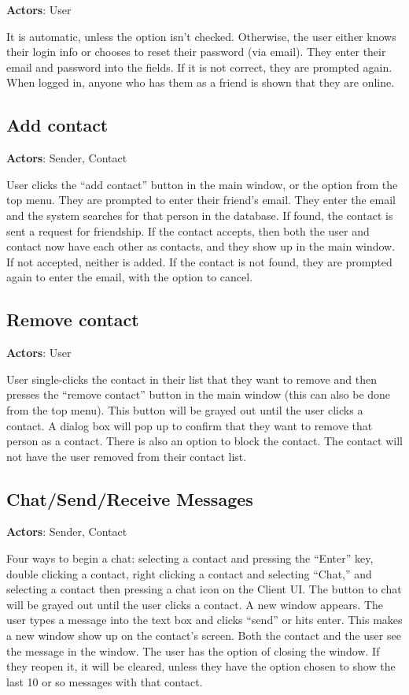 {\bf Actors}: User

It is automatic, unless the option isn't checked. Otherwise, the user either knows their login info or chooses to reset their password (via email). They enter their email and password into the fields. If it is not correct, they are prompted again. When logged in, anyone who has them as a friend is shown that they are online.

\subsection{Add contact}

{\bf Actors}: Sender, Contact

User clicks the ``add contact'' button in the main window, or the option from the top menu. They are prompted to enter their friend's email. They enter the email and the system searches for that person in the database. If found, the contact is sent a request for friendship. If the contact accepts, then both the user and contact now have each other as contacts, and they show up in the main window. If not accepted, neither is added. If the contact is not found, they are prompted again to enter the email, with the option to cancel.

\subsection{Remove contact}

{\bf Actors}: User

User single-clicks the contact in their list that they want to remove and then presses the ``remove contact'' button in the main window (this can also be done from the top menu). This button will be grayed out until the user clicks a contact. A dialog box will pop up to confirm that they want to remove that person as a contact. There is also an option to block the contact. The contact will not have the user removed from their contact list.

\subsection{Chat/Send/Receive Messages}

{\bf Actors}: Sender, Contact

Four ways to begin a chat: selecting a contact and pressing the ``Enter'' key, double clicking a contact, right clicking a contact and selecting ``Chat,'' and selecting a contact then pressing a chat icon on the Client UI. The button to chat will be grayed out until the user clicks a contact.
A new window appears. The user types a message into the text box and clicks ``send'' or hits enter. This makes a new window show up on the contact's screen. Both the contact and the user see the message in the window. The user has the option of closing the window. If they reopen it, it will be cleared, unless they have the option chosen to show the last 10 or so messages with that contact.

